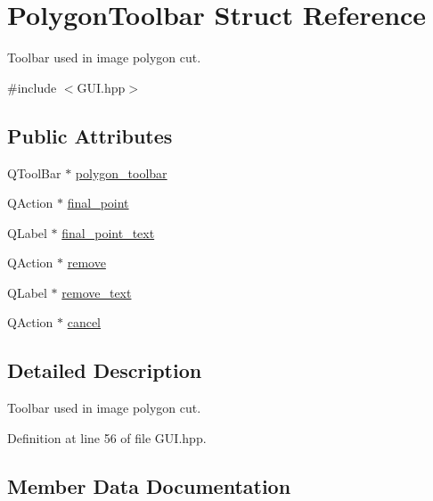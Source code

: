 \hypertarget{structPolygonToolbar}{}\section{Polygon\+Toolbar Struct Reference}
\label{structPolygonToolbar}


Toolbar used in image polygon cut.  




{\ttfamily \#include $<$G\+U\+I.\+hpp$>$}

\subsection*{Public Attributes}
\begin{DoxyCompactItemize}
\item 
Q\+Tool\+Bar $\ast$ \mbox{\hyperlink{structPolygonToolbar_a5388c77217c5bea7075cf234c508b8d6}{polygon\+\_\+toolbar}}
\item 
Q\+Action $\ast$ \mbox{\hyperlink{structPolygonToolbar_a25d471a6081bfa4107d5f1cd9a61d243}{final\+\_\+point}}
\item 
Q\+Label $\ast$ \mbox{\hyperlink{structPolygonToolbar_a3af92f094b85ad63be4d9dcf37a88fa8}{final\+\_\+point\+\_\+text}}
\item 
Q\+Action $\ast$ \mbox{\hyperlink{structPolygonToolbar_ad5f83fc2ac8daf17ae3014d05d3f5d5b}{remove}}
\item 
Q\+Label $\ast$ \mbox{\hyperlink{structPolygonToolbar_ad396d8e37e491bb7bfa8bf91d318014c}{remove\+\_\+text}}
\item 
Q\+Action $\ast$ \mbox{\hyperlink{structPolygonToolbar_aea894e742da9051f58af268c43212a22}{cancel}}
\end{DoxyCompactItemize}


\subsection{Detailed Description}
Toolbar used in image polygon cut. 

Definition at line 56 of file G\+U\+I.\+hpp.



\subsection{Member Data Documentation}
\mbox{\label{structPolygonToolbar_aea894e742da9051f58af268c43212a22}} 
